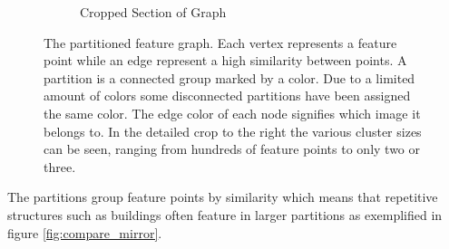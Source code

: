 \documentclass[12pt,journal,compsoc]{IEEEtran}
\begin{document}
\begin{figure}
{\begin{subfigure}[t]{0.3\textwidth}
			\caption{Cropped Section of Graph}
			\label{fig:cropped_graph}
		\end{subfigure}%
	}%
	\caption{The partitioned feature graph. Each vertex represents a 
		feature point while an edge represent a high similarity between 
		points. A partition is a connected group marked by a color.  Due 
		to a limited amount of colors some disconnected partitions have 
		been assigned the same color. The edge color of each node 
		signifies which image it belongs to. In the detailed crop to the 
		right the various cluster sizes can be seen, ranging from 
	hundreds of feature points to only two or three.}
	\label{fig:graph}
\end{figure}
%
The partitions group feature points by similarity which means that 
repetitive structures such as buildings often feature in larger 
partitions as exemplified in figure \ref{fig:compare_mirror}. %
\end{document}
